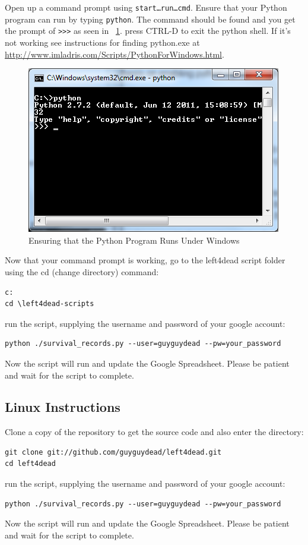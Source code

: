 Open up a command prompt using \texttt{start\ldots{}run\ldots{}cmd}. Ensure that your Python program can run by typing \texttt{python}. The command should be found and you get the prompt of \texttt{>>>} as seen in \figurename\ \ref{fig:python_windows}. press CTRL-D to exit the python shell. If it's not working see instructions for finding python.exe at \url{http://www.imladris.com/Scripts/PythonForWindows.html}.
\begin{figure}[htb]
\centering
\includegraphics[width=0.4\columnwidth]{python_windows}
\caption{Ensuring that the Python Program Runs Under Windows}
\label{fig:python_windows}
\end{figure}

Now that your command prompt is working, go to the left4dead script folder using the cd (change directory) command:
\begin{lstlisting}
c:
cd \left4dead-scripts
\end{lstlisting}
run the script, supplying the username and password of your google account:
\begin{lstlisting}
python ./survival_records.py --user=guyguydead --pw=your_password
\end{lstlisting}

Now the script will run and update the Google Spreadsheet. Please be patient and wait for the script to complete.

\subsection{Linux Instructions}
Clone a copy of the repository to get the source code and also enter the directory:
\begin{lstlisting}
git clone git://github.com/guyguydead/left4dead.git
cd left4dead
\end{lstlisting}
run the script, supplying the username and password of your google account:
\begin{lstlisting}
python ./survival_records.py --user=guyguydead --pw=your_password
\end{lstlisting}

Now the script will run and update the Google Spreadsheet. Please be patient and wait for the script to complete.

